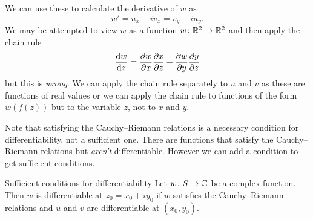 \documentclass{article}
\begin{document}
    We can use these to calculate the derivative of \(w\) as
    \[w' = u_x + iv_x = v_y - iu_y.\]
    We may be attempted to view \(w\) as a function \(w\colon\mathbb{R}^2 \to\mathbb{R}^2\) and then apply the chain rule
    \[\dv{w}{z} = \pdv{w}{x}\pdv{x}{z} + \pdv{w}{y}\pdv{y}{z}\]
    but this is \emph{wrong}.
    We can apply the chain rule separately to \(u\) and \(v\) as these are functions of real values or we can apply the chain rule to functions of the form \(w(f(z))\) but to the variable \(z\), not to \(x\) and \(y\).
    
    Note that satisfying the Cauchy--Riemann relations is a necessary condition for differentiability, not a sufficient one.
    There are functions that satisfy the Cauchy--Riemann relations but \emph{aren't} differentiable.
    However we can add a condition to get sufficient conditions.
    \begin{theorem}{Sufficient conditions for differentiability}{}
        Let \(w\colon S\to\mathbb{C}\) be a complex function.
        Then \(w\) is differentiable at \(z_0 = x_0 + iy_0\) if \(w\) satisfies the Cauchy--Riemann relations and \(u\) and \(v\) are differentiable at \((x_0, y_0)\).
    \end{theorem}
\end{document}
